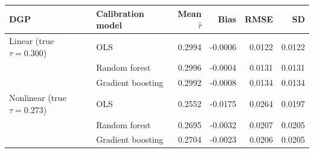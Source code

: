 \begin{tabular}{llrrrr}
\toprule
DGP & Calibration model & Mean $\hat\tau$ & Bias & RMSE & SD \\
\midrule
Linear (true $\tau = 0.300$) & OLS & 0.2994 & -0.0006 & 0.0122 & 0.0122 \\
 & Random forest & 0.2996 & -0.0004 & 0.0131 & 0.0131 \\
 & Gradient boosting & 0.2992 & -0.0008 & 0.0134 & 0.0134 \\
\midrule
Nonlinear (true $\tau = 0.273$) & OLS & 0.2552 & -0.0175 & 0.0264 & 0.0197 \\
 & Random forest & 0.2695 & -0.0032 & 0.0207 & 0.0205 \\
 & Gradient boosting & 0.2704 & -0.0023 & 0.0206 & 0.0205 \\
\bottomrule
\end{tabular}
